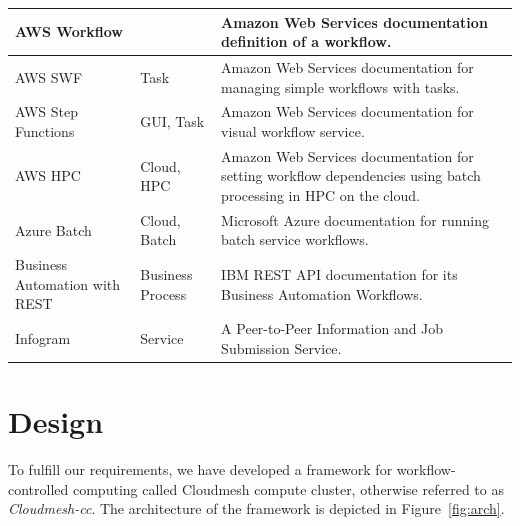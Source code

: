 \documentclass[sigplan,screen]{acmart}
\newcommand{\FILE}[1]{}
\begin{document}
\begin{table}[htb]
{{\begin{tabular}{|p{3cm}|p{3cm}|p{10cm}|}
AWS Workflow \cite{www-aws-workflow} &  & Amazon Web Services documentation definition of a workflow.\\
\hline

AWS SWF \cite{www-aws-swf} & Task & Amazon Web Services documentation for managing simple workflows with tasks. \\
\hline

AWS Step Functions \cite{www-aws-stepfunctions} & GUI, Task & Amazon Web Services documentation for visual workflow service. \\
\hline

AWS HPC  \cite{www-aws-batch-workflow} & Cloud, HPC & Amazon Web Services documentation for setting workflow dependencies using batch processing in HPC on the cloud. \\
\hline

Azure Batch \cite{www-azure-batch} & Cloud, Batch & Microsoft Azure documentation for running batch service workflows. \\
  \hline

 Business Automation with REST \cite{www-business-rest-ibm} & Business
                                        Process& IBM REST API documentation for its Business Automation Workflows. \\
\hline

  


Infogram \cite{las-02-infogram} & Service & A Peer-to-Peer Information and Job Submission Service.\\
\hline
\end{tabular}
}
}
\end{table}

% 

\FILE{cc-design.tex}

\section{Design}

To fulfill our requirements, we have developed a framework for
workflow-controlled computing called Cloudmesh compute cluster,
otherwise referred to as {\em Cloudmesh-cc}. The architecture of the
framework is depicted in Figure~\ref{fig:arch}.
\end{document}
